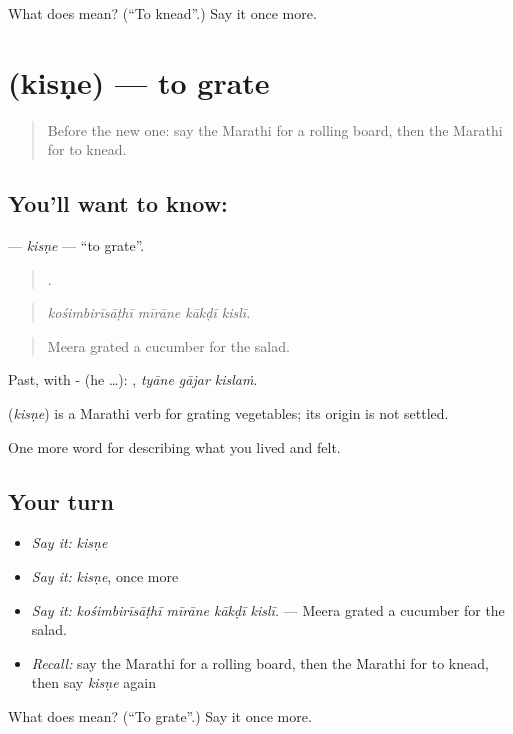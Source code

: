 \begin{tcolorbox}[breakable,colback=teal!4,colframe=teal!35!black,title={Before you move on}]
What does  mean? (\textquotedblleft{}To knead\textquotedblright{}.) Say it once more.
\end{tcolorbox}
\section[\texorpdfstring{\mr{किसणे} (kisṇe)}{किसणे (kisṇe)}]{ (kisṇe) — to grate}

\label{lesson:MR-C526-kisne}



\begin{quote}
Before the new one: say the Marathi for a rolling board, then the Marathi for to knead.
\end{quote}

\subsection*{You'll want to know: }
\textbf{} — \emph{kisṇe} — \textquotedblleft{}to grate\textquotedblright{}.

\begin{quote}
   .
\end{quote}

\begin{quote}
\emph{kośimbirīsāṭhī mīrāne kākḍī kislī.}
\end{quote}

\begin{quote}
Meera grated a cucumber for the salad.
\end{quote}

Past, with - (he …):   , \emph{tyāne gājar kislaṁ}.

\begin{cousinweb}
\textbf{} (\emph{kisṇe}) is a Marathi verb for grating vegetables; its origin is not settled.
\end{cousinweb}

\begin{grammarlens}[title={What you've built}]
One more word for describing what you lived and felt.
\end{grammarlens}

\subsection*{Your turn}
\begin{itemize}
\raggedright
  \item \emph{Say it:} \emph{kisṇe}
  \item \emph{Say it:} \emph{kisṇe}, once more
  \item \emph{Say it:} \emph{kośimbirīsāṭhī mīrāne kākḍī kislī.} — Meera grated a cucumber for the salad.
  \item \emph{Recall:} say the Marathi for a rolling board, then the Marathi for to knead, then say \emph{kisṇe} again
\end{itemize}

\begin{tcolorbox}[breakable,colback=teal!4,colframe=teal!35!black,title={Before you move on}]
What does  mean? (\textquotedblleft{}To grate\textquotedblright{}.) Say it once more.
\end{tcolorbox}
